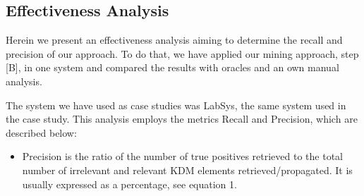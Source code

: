
\subsection{Effectiveness Analysis}\label{hypothesis_formulation}	

Herein we present an effectiveness analysis aiming to determine the recall and precision of our approach. To do that, we have applied our mining approach, step [B], in one system and compared the results with oracles and an own manual analysis. 

The system we have used as case studies was LabSys, the same system used in the case study. This analysis
employs the metrics Recall and Precision, which are described below:

\begin{itemize}
\item Precision is the ratio of the number of true positives retrieved to the total number of irrelevant and relevant KDM elements retrieved/propagated. It is usually expressed as a percentage, see equation 1.
\end{itemize}


